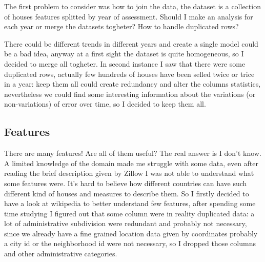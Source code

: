 The first problem to consider was how to join the data, the dataset is a collection of houses features splitted by year of assessment. Should I make an analysis for each year or merge the datasets togheter? How to handle duplicated rows?
    
There could be different trends in different years and create a single model could be a bad idea, anyway at a first sight the dataset is quite homogeneous, so I decided to merge all togheter. In second instance I saw that there were some duplicated rows, actually few hundreds of houses have been selled twice or trice in a year: keep them all could create redundancy and alter the columns statistics, nevertheless we could find some interesting information about the variations (or non-variations) of error over time, so I decided to keep them all.

\subsection{Features}
    
There are many features! Are all of them useful? The real answer is I don't know. A limited knowledge of the domain made me struggle with some data, even after reading the brief description given by Zillow I was not able to understand what some features were. It's hard to believe how different countries can have such different kind of houses and measures to describe them. So I firstly decided to have a look at wikipedia to better understand few features, after spending some time studying I figured out that some column were in reality duplicated data: a lot of administrative subdivision were redundant and probably not necessary, since we already have a fine grained location data given by coordinates probably a city id or the neighborhood id were not necessary, so I dropped those columns and other administrative categories.


